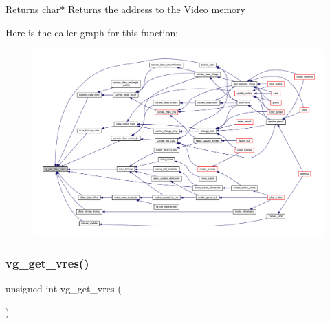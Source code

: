 \begin{DoxyReturn}{Returns}
char$\ast$ Returns the address to the Video memory 
\end{DoxyReturn}
Here is the caller graph for this function\+:\nopagebreak
\begin{figure}[H]
\begin{center}
\leavevmode
\includegraphics[width=350pt]{group__video_ga0cd2b85b0088ab47b2b7bb6c135ad4b1_icgraph}
\end{center}
\end{figure}
\mbox{\label{group__video_ga4633499e0f197ac855f56473fc9fb291}} 
\subsubsection{\texorpdfstring{vg\+\_\+get\+\_\+vres()}{vg\_get\_vres()}}
{\footnotesize\ttfamily unsigned int vg\+\_\+get\+\_\+vres (\begin{DoxyParamCaption}{ }\end{DoxyParamCaption})}

